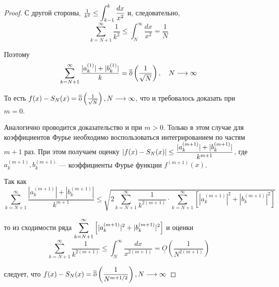 \begin{proof}
    С другой стороны, $\frac{1}{k^2} \leq \displaystyle\int_{k - 1}^k \frac{dx}{x^2}$ и,
    следовательно,
    \[ 
        \sum_{k = N + 1}^\infty \frac{1}{k^2} \leq \int_N^\infty \frac{dx}{x^2} 
        = \frac{1}{N}
    \]

    Поэтому \[
        \sum_{k = N + 1}^\infty \frac{|a_k^{(1)}| + |b_k^{(1)}|}{k} =
        \overline{\overline{o}} \left( \frac{1}{\sqrt{N}} \right), \quad
        N \underset{}{\longrightarrow} \infty
    \]

    То есть $f(x) - S_N(x) = \overline{\overline{o}} \left( \frac{1}{\sqrt{N}} \right),
    N \underset{}{\longrightarrow} \infty$, что и требовалось доказать при $m = 0$.

    Аналогично проводится доказательство и при $m > 0$. Только в этом случае
    для коэффициентов Фурье необходимо воспользоваться интегрированием по
    частям $m + 1$ раз. При этом получаем оценку $|f(x) - S_N(x)| \leq
    \displaystyle\frac{|a_k^{(m + 1)}| + |b_k^{(m + 1)}|}{k^{m + 1}}$, где 
    $a_k^{(m + 1)}, b_k^{(m + 1)}$ --- коэффициенты Фурье функции
    $f^{(m + 1)}(x)$.

    Так как \[
        \sum_{k = N + 1}^\infty \frac{|a_k^{(m + 1)}| + |b_k^{(m + 1)}|}{k^{m + 1}} \leq
        \sqrt{
            2 \sum_{k = N + 1}^\infty \frac{1}{k^{2(m + 1)}} \cdot
            \sum_{k = N + 1}^\infty \left[ |a_k^{(m + 1)}|^2 + |b_k^{(m + 1)}|^2 \right]
        }
    \]

    то из сходимости ряда $\displaystyle\sum_{k = N + 1}^\infty \left[ |a_k^{(m + 1)}|^2 + |b_k^{(m + 1)}|^2 \right]$
    и оценки \[
        \sum_{k = N + 1}^\infty \frac{1}{k^{2(m + 1)}} \leq
        \int_N^\infty \frac{dx}{x^{2(m + 1)}} =
        \underline{\underline{O}} \left( \frac{1}{N^{2 (m + 1)}} \right)
    \]

    следует, что $f(x) - S_N(x) = \overline{\overline{o}} \left(
        \displaystyle\frac{1}{N^{m + 1/2}}
    \right), N \underset{}{\longrightarrow} \infty$
\end{proof}